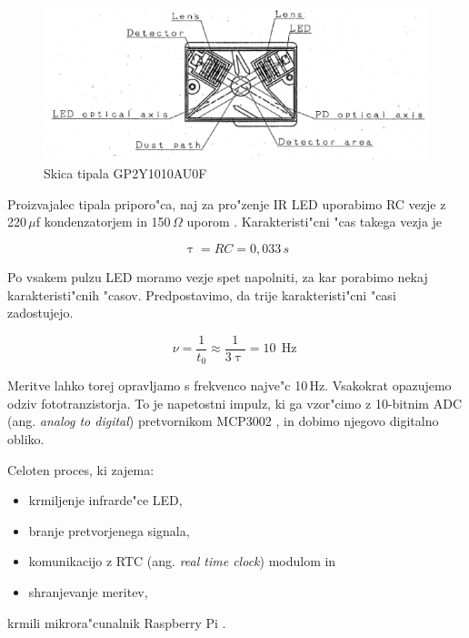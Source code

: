\documentclass[11pt,a4paper]{article}
\DeclareMathOperator{\Hz}{Hz}
\begin{document}
\begin{figure}[H]
	\begin{center}
		\includegraphics[width=12cm]{sensor-scheme.png}
		\caption{Skica tipala GP2Y1010AU0F}
		\label{sensor-scheme}
	\end{center}
\end{figure}

Proizvajalec tipala priporo"ca, naj za pro"zenje IR LED uporabimo RC vezje z 220\,$\mu$f kondenzatorjem in 150\,$\Omega$ uporom \cite{sharp-gp2y1010au0f}. Karakteristi"cni "cas takega vezja je

$$
\uptau = RC = 0,033\,s
$$

Po vsakem pulzu LED moramo vezje spet napolniti, za kar porabimo nekaj karakteristi"cnih "casov. Predpostavimo, da trije karakteristi"cni "casi zadostujejo.

$$
\nu = \frac{1}{t_0} \approx \frac{1}{3 \uptau} = 10\,\Hz
$$

Meritve lahko torej opravljamo s frekvenco najve"c 10\,Hz. Vsakokrat opazujemo odziv fototranzistorja. To je napetostni impulz, ki ga vzor"cimo z 10-bitnim ADC (ang. \textit{analog to digital}) pretvornikom MCP3002 \cite{mcp3002}, in dobimo njegovo digitalno obliko.

Celoten proces, ki zajema:
\begin{itemize}
	\item krmiljenje infrarde"ce LED,
	\item branje pretvorjenega signala,
	\item komunikacijo z RTC (ang. \textit{real time clock}) modulom in
	\item shranjevanje meritev,
\end{itemize}

krmili mikrora"cunalnik Raspberry Pi \cite{rbpi-wiki}.
\end{document}
